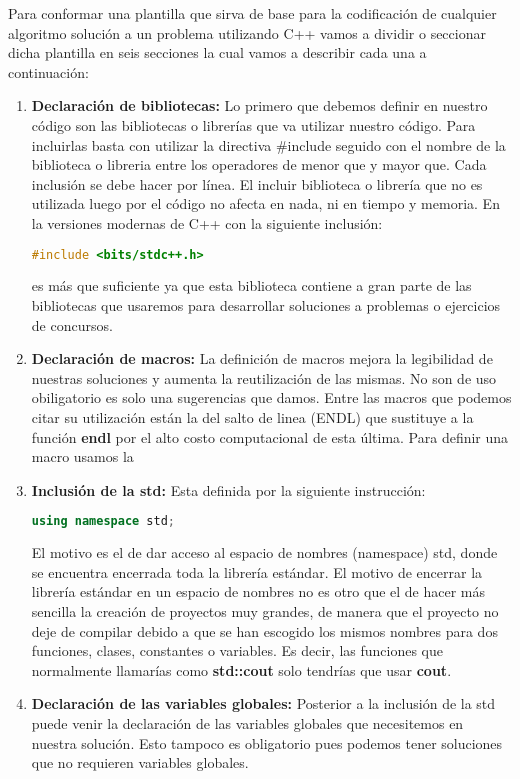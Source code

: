 Para conformar una plantilla que sirva de base para la codificación de cualquier algoritmo solución a un problema utilizando C++ vamos a dividir o seccionar dicha plantilla en seis secciones la cual vamos a describir cada una a continuación:

\begin{enumerate}
	\item \textbf{Declaración de bibliotecas:} Lo primero que debemos definir en nuestro código son las bibliotecas o librerías que va utilizar nuestro código. Para incluirlas basta con utilizar la directiva \#include seguido con el nombre de la biblioteca o libreria entre los operadores de menor que y mayor que. Cada inclusión se debe hacer por línea. El incluir biblioteca o librería que no es utilizada luego por el código no afecta en nada, ni en tiempo y memoria. En la versiones modernas de C++ con la siguiente inclusión:
	\begin{lstlisting}[language=C++]
#include <bits/stdc++.h>
	\end{lstlisting}
es más que suficiente ya que esta biblioteca contiene a gran parte de las bibliotecas que usaremos para desarrollar soluciones a problemas o ejercicios de concursos.
	\item \textbf{Declaración de macros:} La definición de macros mejora la legibilidad de nuestras soluciones y aumenta la reutilización de las mismas. No son de uso obiligatorio es solo una sugerencias que damos. Entre las macros que podemos citar su utilización están la del salto de linea (ENDL) que sustituye a la función \textbf{endl} por el alto costo computacional de esta última. Para definir una macro usamos la 
	\item \textbf{Inclusión de la std:} Esta definida por la siguiente instrucción:
	\begin{lstlisting}[language=C++]
using namespace std;
	\end{lstlisting}
	El motivo es el de dar acceso al espacio de nombres (namespace) std, donde se encuentra encerrada toda la librería estándar. El motivo de encerrar la librería estándar en un espacio de nombres no es otro que el de hacer más sencilla la creación de proyectos muy grandes, de manera que el proyecto no deje de compilar debido a que se han escogido los mismos nombres para dos funciones, clases, constantes o variables. Es decir, las funciones que normalmente llamarías como \textbf{std::cout} solo tendrías que usar \textbf{cout}.
	\item \textbf{Declaración de las variables globales:} Posterior a la inclusión de la std puede venir la declaración de las variables globales que necesitemos en nuestra solución. Esto tampoco es obligatorio pues podemos tener soluciones que no requieren variables globales.

\end{enumerate}
